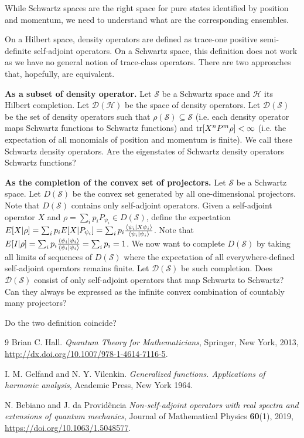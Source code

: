 {While Schwartz spaces are the right space for pure states identified by position and momentum, we need to understand what are the corresponding ensembles.}

On a Hilbert space, density operators are defined as trace-one positive semi-definite self-adjoint operators. On a Schwartz space, this definition does not work as we have no general notion of trace-class operators. There are two approaches that, hopefully, are equivalent.

\textbf{As a subset of density operator.} Let $\mathcal{S}$ be a Schwartz space and $\mathcal{H}$ its Hilbert completion. Let $\mathcal{D}(\mathcal{H})$ be the space of density operators. Let $\mathcal{D}(\mathcal{S})$ be the set of density operators such that $\rho(\mathcal{S}) \subseteq \mathcal{S}$ (i.e. each density operator maps Schwartz functions to Schwartz functions) and $\operatorname{tr}[X^n P^m \rho] < \infty$ (i.e. the expectation of all monomials of position and momentum is finite). We call these Schwartz density operators. Are the eigenstates of Schwartz density operators Schwartz functions?

\textbf{As the completion of the convex set of projectors.} Let $\mathcal{S}$ be a Schwartz space. Let $D(\mathcal{S})$ be the convex set generated by all one-dimensional projectors. Note that $D(\mathcal{S})$ contains only self-adjoint operators. Given a self-adjoint operator $X$ and $\rho = \sum_i p_i P_{\psi_i} \in D(\mathcal{S})$, define the expectation $E[X|\rho] = \sum_i p_i E[X|P_{\psi_i}] = \sum_i p_i \frac{\langle\psi_i | X \psi_i\rangle}{\langle\psi_i | \psi_i\rangle}$. Note that $E[I|\rho] = \sum_i p_i \frac{\langle\psi_i | \psi_i\rangle}{\langle\psi_i | \psi_i\rangle} = \sum_i p_i = 1$. We now want to complete $D(\mathcal{S})$ by taking all limits of sequences of $D(\mathcal{S})$ where the expectation of all everywhere-defined self-adjoint operators remains finite. Let $\mathcal{D}(\mathcal{S})$ be such completion. Does $\mathcal{D}(\mathcal{S})$ consist of only self-adjoint operators that map Schwartz to Schwartz? Can they always be expressed as the infinite convex combination of countably many projectors?

Do the two definition coincide?


\begin{thebibliography}{9}
		Brian C. Hall.
		\textit{Quantum Theory for Mathematicians},
		Springer, New York,
		2013,
		\url{http://dx.doi.org/10.1007/978-1-4614-7116-5}.

		I. M. Gelfand and N. Y. Vilenkin.
		\textit{Generalized functions. Applications of harmonic analysis},
		Academic Press, New York
		1964.

		N. Bebiano and J. da Providência
		\textit{Non-self-adjoint operators with real spectra and extensions of quantum mechanics},
		Journal of Mathematical Physics \textbf{60}(1),
		2019,
		\url{https://doi.org/10.1063/1.5048577}.


\end{thebibliography}
